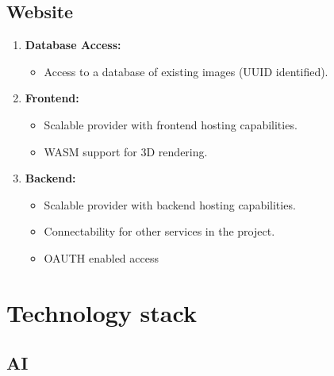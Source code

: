 \section{Website}
\begin{enumerate}
    \item \textbf{Database Access:}
    \begin{itemize}
    \item Access to a database of existing images (UUID identified).
    \end{itemize}

\item \textbf{Frontend:}
    \begin{itemize}
    \item Scalable provider with frontend hosting capabilities.
    \item WASM support for 3D rendering.
    \end{itemize}

\item \textbf{Backend:}
    \begin{itemize}
    \item Scalable provider with backend hosting capabilities.
    \item Connectability for other services in the project.
    \item OAUTH enabled access
    \end{itemize}
\end{enumerate}

\newpage

\chapter{Technology stack}
\section{AI}

